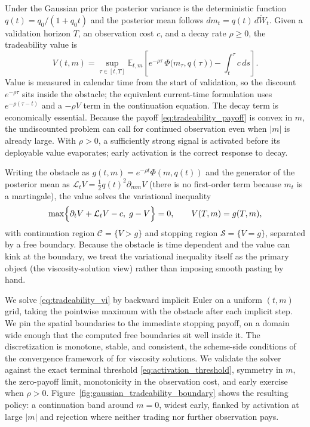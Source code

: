 \documentclass[11pt]{article}
\begin{document}
Under the Gaussian prior the posterior variance is the deterministic function
$q(t)=q_0/(1+q_0t)$ and the posterior mean follows $dm_t=q(t)\,d\widetilde W_t$.  Given
a validation horizon $T$, an observation cost $c$, and a decay rate $\rho\ge0$, the
tradeability value is
\begin{equation}
    V(t,m)
    =
    \sup_{\tau\in[t,T]}
    \mathbb E_{t,m}
    \left[
        e^{-\rho\tau}\,\Phi\bigl(m_\tau,q(\tau)\bigr)-\int_t^\tau c\,ds
    \right].
    \label{eq:tradeability_value}
\end{equation}
Value is measured in calendar time from the start of validation, so the discount
$e^{-\rho\tau}$ sits inside the obstacle; the equivalent current-time formulation uses
$e^{-\rho(\tau-t)}$ and a $-\rho V$ term in the continuation equation.  The decay term
is economically essential.  Because the payoff \eqref{eq:tradeability_payoff} is convex
in $m$, the undiscounted problem can call for continued observation even when $|m|$ is already
large.  With $\rho>0$, a sufficiently strong signal is activated before its deployable
value evaporates; early activation is the correct response to decay.

Writing the obstacle as $g(t,m)=e^{-\rho t}\Phi(m,q(t))$ and the generator of the
posterior mean as $\mathcal L_tV=\tfrac12q(t)^2\partial_{mm}V$ (there is no first-order
term because $m_t$ is a martingale), the value solves the variational inequality
\begin{equation}
    \max\Bigl\{
        \partial_tV+\mathcal L_tV-c,\;
        g-V
    \Bigr\}=0,
    \qquad
    V(T,m)=g(T,m),
    \label{eq:tradeability_vi}
\end{equation}
with continuation region $\mathcal C=\{V>g\}$ and stopping region $\mathcal S=\{V=g\}$,
separated by a free boundary.  Because the obstacle is time dependent and the value can
kink at the boundary, we treat the variational inequality itself as the primary
object (the viscosity-solution view) rather than imposing smooth pasting by hand.

We solve \eqref{eq:tradeability_vi} by backward implicit Euler on a uniform $(t,m)$
grid, taking the pointwise maximum with the obstacle after each implicit step.  We pin
the spatial boundaries to the immediate stopping payoff, on a domain wide
enough that the computed free boundaries sit well inside it.  The discretization is monotone, stable,
and consistent, the scheme-side conditions of the convergence framework of
\citet{barlesSouganidis1991} for viscosity solutions.  We validate the solver against
the exact terminal threshold \eqref{eq:activation_threshold}, symmetry in $m$, the
zero-payoff limit, monotonicity in the observation cost, and early exercise when
$\rho>0$.
Figure~\ref{fig:gaussian_tradeability_boundary} shows the resulting policy: a
continuation band around $m=0$, widest early, flanked by activation at large $|m|$ and
rejection where neither trading nor further observation pays.
\end{document}
